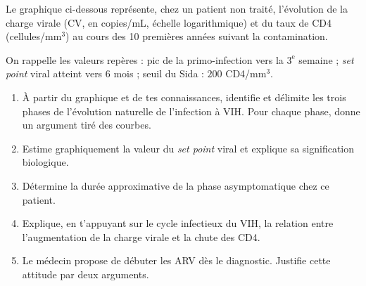 \documentclass[11pt]{article}
\begin{document}
\begin{exercice}
Le graphique ci-dessous représente, chez un patient non traité, l'évolution de la charge virale (CV, en copies/mL, échelle logarithmique) et du taux de CD4 (cellules/mm$^3$) au cours des 10 premières années suivant la contamination.

\begin{center}
\end{center}

On rappelle les valeurs repères : pic de la primo-infection vers la $3^{\text{e}}$ semaine ; \emph{set point} viral atteint vers 6 mois ; seuil du Sida : $200$ CD4/mm$^3$.
\begin{enumerate}
\item À partir du graphique et de tes connaissances, identifie et délimite les trois phases de l'évolution naturelle de l'infection à VIH. Pour chaque phase, donne un argument tiré des courbes.
\item Estime graphiquement la valeur du \emph{set point} viral et explique sa signification biologique.
\item Détermine la durée approximative de la phase asymptomatique chez ce patient.
\item Explique, en t'appuyant sur le cycle infectieux du VIH, la relation entre l'augmentation de la charge virale et la chute des CD4.
\item Le médecin propose de débuter les ARV dès le diagnostic. Justifie cette attitude par deux arguments.
\end{enumerate}
\end{exercice}
\end{document}
